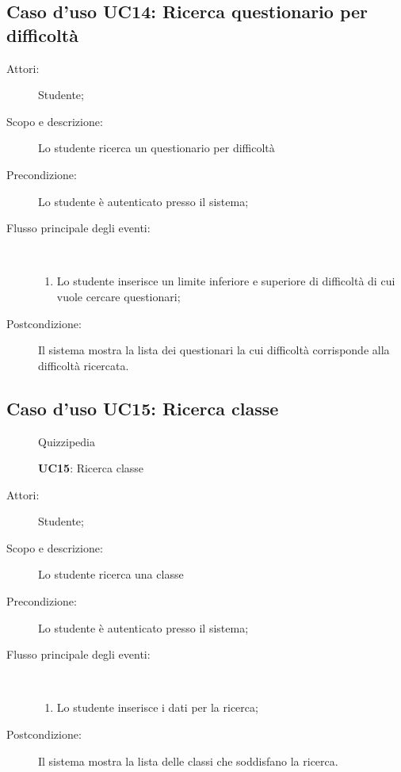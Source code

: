 \subsection{Caso d'uso UC14: Ricerca questionario per difficoltà}\begin{description}
	\item[Attori:] Studente;
	\item[Scopo e descrizione:] Lo studente ricerca un questionario per difficoltà
	\item[Precondizione:] Lo studente è autenticato presso il sistema;
	
	\item[Flusso principale degli eventi:] \ 
	\begin{enumerate}
		\item Lo studente inserisce un limite inferiore e superiore di difficoltà di cui vuole cercare questionari;
		
	\end{enumerate}
	\item[Postcondizione:] Il sistema mostra la lista dei questionari la cui difficoltà corrisponde alla difficoltà ricercata.
\end{description}
\hypertarget{UC15}{}
\subsection{Caso d'uso UC15: Ricerca classe}
\begin{figure}[H]
	\centering
	\begin{resizedtikzpicture}{\textwidth}
		\begin{umlsystem}[x=0, fill=lightgray!20]{Quizzipedia}
			\umlassoc{Studente}{28}
			\umlinherit{30}{28}
			\umlinherit{29}{28}
		\end{umlsystem}
	\end{resizedtikzpicture}
	\caption{\textbf{UC15}: Ricerca classe}
	\label{UC15}
\end{figure}
\begin{description}
	\item[Attori:] Studente;
	\item[Scopo e descrizione:] Lo studente ricerca una classe
	\item[Precondizione:] Lo studente è autenticato presso il sistema;
	
	\item[Flusso principale degli eventi:] \ 
	\begin{enumerate}
		\item Lo studente inserisce i dati per la ricerca;
		
	\end{enumerate}
	\item[Postcondizione:] Il sistema mostra la lista delle classi che soddisfano la ricerca.
\end{description}
\hypertarget{UC16}{}
